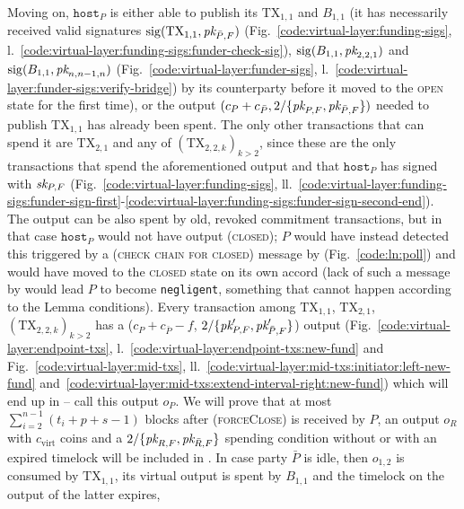   Moving on, $\texttt{host}_P$ is either able to publish its $\mathrm{TX}_{1,
  1}$ and $B_{1, 1}$ (it has necessarily received valid signatures
  $\mathrm{sig}(\mathrm{TX}_{1, 1}, \textit{pk}_{\bar{P}, F})$
  (Fig.~\ref{code:virtual-layer:funding-sigs},
  l.~\ref{code:virtual-layer:funding-sigs:funder-check-sig}),
  $\mathrm{sig}(B_{1, 1}, \textit{pk}_{2, 2, 1})$ and
  $\mathrm{sig}(B_{1, 1}, \textit{pk}_{n, n-1, n})$
  (Fig.~\ref{code:virtual-layer:funder-sigs},
  l.~\ref{code:virtual-layer:funder-sigs:verify-bridge}) by its counterparty
  before it moved to the \textsc{open} state for the first time), or the output
  $(c_P + c_{\bar{P}}, 2/\{\textit{pk}_{P, F}, \textit{pk}_{\bar{P}, F}\})$ needed to publish
  $\mathrm{TX}_{1, 1}$ has already been spent. The only other transactions that
  can spend it are $\mathrm{TX}_{2, 1}$ and any of $(\mathrm{TX}_{2, 2, k})_{k >
  2}$, since these are the only transactions that spend the aforementioned
  output and that $\texttt{host}_P$ has signed with $\textit{sk}_{P, F}$
  (Fig.~\ref{code:virtual-layer:funding-sigs},
  ll.~\ref{code:virtual-layer:funding-sigs:funder-sign-first}-\ref{code:virtual-layer:funding-sigs:funder-sign-second-end}).
  The output can be also spent by old, revoked commitment transactions, but in
  that case $\texttt{host}_P$ would not have output (\textsc{closed}); $P$ would
  have instead detected this triggered by a (\textsc{check chain for closed})
  message by \environment (Fig.~\ref{code:ln:poll}) and would have moved to the
  \textsc{closed} state on its own accord (lack of such a message by
  \environment would lead $P$ to become \texttt{negligent}, something that
  cannot happen according to the Lemma conditions). Every transaction among
  $\mathrm{TX}_{1, 1}$, $\mathrm{TX}_{2, 1}$, $(\mathrm{TX}_{2, 2, k})_{k > 2}$
  has a ($c_P + c_{\bar{P}} - f$, $2/\{\textit{pk}_{P, F}', \textit{pk}_{\bar{P}, F}'\}$) output
  (Fig.~\ref{code:virtual-layer:endpoint-txs},
  l.~\ref{code:virtual-layer:endpoint-txs:new-fund} and
  Fig.~\ref{code:virtual-layer:mid-txs},
  ll.~\ref{code:virtual-layer:mid-txs:initiator:left-new-fund}
  and~\ref{code:virtual-layer:mid-txs:extend-interval-right:new-fund}) which
  will end up in \ledger{} -- call this output $o_P$. We will prove that at most
  $\sum\limits_{i=2}^{n-1}(t_i + p + s - 1)$ blocks after (\textsc{forceClose}) is
  received by $P$, an output $o_R$ with $c_{\mathrm{virt}}$ coins and a
  $2/\{\textit{pk}_{R, F}, \textit{pk}_{\bar{R}, F}\}$ spending condition without or with an
  expired timelock will be included in \ledger. In case party $\bar{P}$ is idle,
  then $o_{1, 2}$ is consumed by $\mathrm{TX}_{1, 1}$, its virtual output is
  spent by $B_{1, 1}$ and the timelock on the output of the latter expires,
